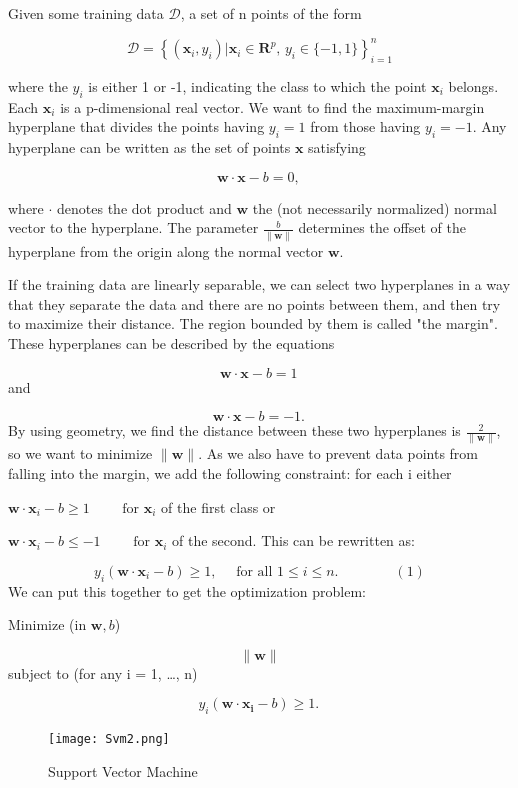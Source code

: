 \documentclass[12pt]{book}
\begin{document}
Given some training data $\mathcal{D}$, a set of n points of the form

$$\mathcal{D} = \left\{ (\mathbf{x}_i, y_i) | \mathbf{x}_i \in \mathbf{R}^p,\, y_i \in \{-1,1\}\right\}_{i=1}^n$$

where the $y_i$ is either 1 or -1, indicating the class to which the point $\mathbf{x}_i$  belongs. Each  $\mathbf{x}_i$  is a p-dimensional real vector. 
We want to find the maximum-margin hyperplane that divides the points having $y_i=1$ from those having $y_i=-1$. Any hyperplane can be written as the set of points $\mathbf{x}$ satisfying

$$ \mathbf{w}\cdot\mathbf{x} - b=0,\, $$

where $\cdot$ denotes the dot product and ${\mathbf{w}}$ the (not necessarily normalized) normal vector to the hyperplane. The parameter $\tfrac{b}{\|\mathbf{w}\|}$ determines the offset of the 
hyperplane from the origin along the normal vector ${\mathbf{w}}$.

If the training data are linearly separable, we can select two hyperplanes in a way that they separate the data and there are no points between them, and then try to maximize their distance. 
The region bounded by them is called "the margin". These hyperplanes can be described by the equations

$$\mathbf{w}\cdot\mathbf{x} - b=1\,$$
and

$$\mathbf{w}\cdot\mathbf{x} - b=-1.\,$$
By using geometry, we find the distance between these two hyperplanes is $\tfrac{2}{\|\mathbf{w}\|}$, so we want to minimize $\|\mathbf{w}\|$. As we also have to prevent data points from falling into the margin, we add the following constraint: for each i either

$\mathbf{w}\cdot\mathbf{x}_i - b \ge 1\qquad\text{ for }\mathbf{x}_i $ of the first class
or

$\mathbf{w}\cdot\mathbf{x}_i - b \le -1\qquad\text{ for }\mathbf{x}_i $  of the second.
This can be rewritten as:

$$y_i(\mathbf{w}\cdot\mathbf{x}_i - b) \ge 1, \quad \text{ for all } 1 \le i \le n.\qquad\qquad(1) $$
We can put this together to get the optimization problem:

Minimize (in ${\mathbf{w},b}$)

$$\|\mathbf{w}\|$$
subject to (for any i = 1, \dots, n)

$$y_i(\mathbf{w}\cdot\mathbf{x_i} - b) \ge 1. \, $$

\begin{figure}[H]
\centering
\texttt{[image: Svm2.png]}
\caption{Support Vector Machine \cite{wikipedia-svm}}
\label{fig:figure2}
\end{figure}
\end{document}
